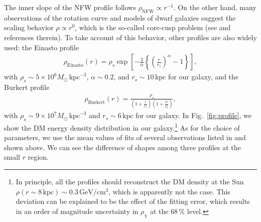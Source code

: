 \documentclass[12pt,twoside,book]{article}
\begin{document}
The inner slope of the NFW profile follows $\rho_{\mathrm{NFW}} \propto r^{-1}$.
On the other hand, many observations of the rotation curve and models of dwarf galaxies suggest the scaling behavior $\rho \propto r^0$, which is the so-called core-cusp problem (see \cite{Genina_2017} and references therein).
To take account of this behavior, other profiles are also widely used: the Einasto profile \cite{1965TrAlm...5...87E, Graham:2005xx}
\begin{align}
  \rho_{\mathrm{Einasto}} (r) = \rho_s \exp \left[
  -\frac{2}{\alpha} \left\{ \left( \frac{r}{r_s} \right)^\alpha - 1 \right\} \right],
\end{align}
with $\rho_s \sim 5 \times 10^6 M_\odot\, \mathrm{kpc}^{-3}$, $\alpha \sim 0.2$, and $r_s \sim 10\,\mathrm{kpc}$ for our galaxy, and the Burkert profile \cite{Burkert:1995yz}
\begin{align}
  \rho_{\mathrm{Burkert}} (r) = \frac{\rho_s}
  {\left( 1 + \frac{r}{r_s} \right) \left( 1 + \frac{r^2}{r_s^2} \right)},
\end{align}
with $\rho_s \sim 9 \times 10^7 M_\odot\, \mathrm{kpc}^{-3}$ and $r_s \sim 6\, \mathrm{kpc}$ for our galaxy.
In Fig.~\ref{fig:profile}, we show the DM energy density distribution in our galaxy.\footnote{
  In principle, all the profiles should reconstruct the DM density at the Sun $\rho (r \sim 8\, \mathrm{kpc}) \sim 0.3\, \mathrm{GeV} / \mathrm{cm}^3$, which is apparently not the case.
  This deviation can be explained to be the effect of the fitting error, which results in an order of magnitude uncertainty in $\rho_\chi$ at the $68\,\%$ level.
}
As for the choice of parameters, we use the mean values of fits of several observations listed in \cite{Fornasa:2013iaa} and shown above.
We can see the difference of shapes among three profiles at the small $r$ region.
\end{document}
